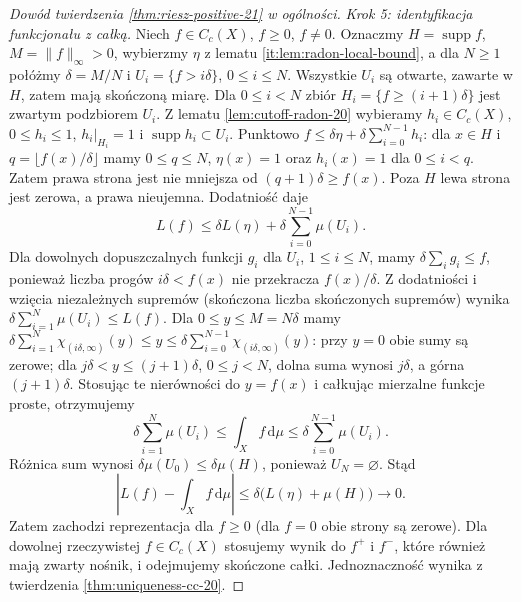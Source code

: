 \begin{proof}[Dowód twierdzenia \ref{thm:riesz-positive-21} w ogólności]
\emph{Krok 5: identyfikacja funkcjonału z całką.}
Niech $f\in C_c(X)$, $f\ge0$, $f\ne0$. Oznaczmy $H=\operatorname{supp}f$, $M=\|f\|_\infty>0$, wybierzmy $\eta$ z lematu \ref{it:lem:radon-local-bound}, a dla $N\ge1$ połóżmy $\delta=M/N$ i $U_i=\{f>i\delta\}$, $0\le i\le N$. Wszystkie $U_i$ są otwarte, zawarte w $H$, zatem mają skończoną miarę. Dla $0\le i<N$ zbiór $H_i=\{f\ge(i+1)\delta\}$ jest zwartym podzbiorem $U_i$. Z lematu \ref{lem:cutoff-radon-20} wybieramy $h_i\in C_c(X)$, $0\le h_i\le1$, $h_i|_{H_i}=1$ i $\operatorname{supp}h_i\subset U_i$. Punktowo $f\le\delta\eta+\delta\sum_{i=0}^{N-1}h_i$: dla $x\in H$ i $q=\lfloor f(x)/\delta\rfloor$ mamy $0\le q\le N$, $\eta(x)=1$ oraz $h_i(x)=1$ dla $0\le i<q$. Zatem prawa strona jest nie mniejsza od $(q+1)\delta\ge f(x)$. Poza $H$ lewa strona jest zerowa, a prawa nieujemna. Dodatniość daje
\[
 L(f)\le\delta L(\eta)+\delta\sum_{i=0}^{N-1}\mu(U_i).
\]
Dla dowolnych dopuszczalnych funkcji $g_i$ dla $U_i$, $1\le i\le N$, mamy $\delta\sum_i g_i\le f$, ponieważ liczba progów $i\delta<f(x)$ nie przekracza $f(x)/\delta$. Z dodatniości i wzięcia niezależnych supremów (skończona liczba skończonych supremów) wynika $\delta\sum_{i=1}^N\mu(U_i)\le L(f)$. Dla $0\le y\le M=N\delta$ mamy
$\delta\sum_{i=1}^{N}\chi_{(i\delta,\infty)}(y)\le y
\le\delta\sum_{i=0}^{N-1}\chi_{(i\delta,\infty)}(y)$:
przy $y=0$ obie sumy są zerowe; dla
$j\delta<y\le(j+1)\delta$, $0\le j<N$,
dolna suma wynosi $j\delta$, a górna $(j+1)\delta$.
Stosując te nierówności do $y=f(x)$ i całkując
mierzalne funkcje proste, otrzymujemy
\[
 \delta\sum_{i=1}^{N}\mu(U_i)
 \le\int_X f\,\mathrm d\mu
 \le\delta\sum_{i=0}^{N-1}\mu(U_i).
\]
Różnica sum wynosi $\delta\mu(U_0)\le\delta\mu(H)$, ponieważ $U_N=\varnothing$. Stąd
\[
 \left|L(f)-\int_X f\,\mathrm d\mu\right|
 \le\delta\bigl(L(\eta)+\mu(H)\bigr)\longrightarrow0.
\]
Zatem zachodzi reprezentacja dla $f\ge0$ (dla $f=0$ obie strony są zerowe). Dla dowolnej rzeczywistej $f\in C_c(X)$ stosujemy wynik do $f^+$ i $f^-$, które również mają zwarty nośnik, i odejmujemy skończone całki. Jednoznaczność wynika z twierdzenia \ref{thm:uniqueness-cc-20}. 
\end{proof}



